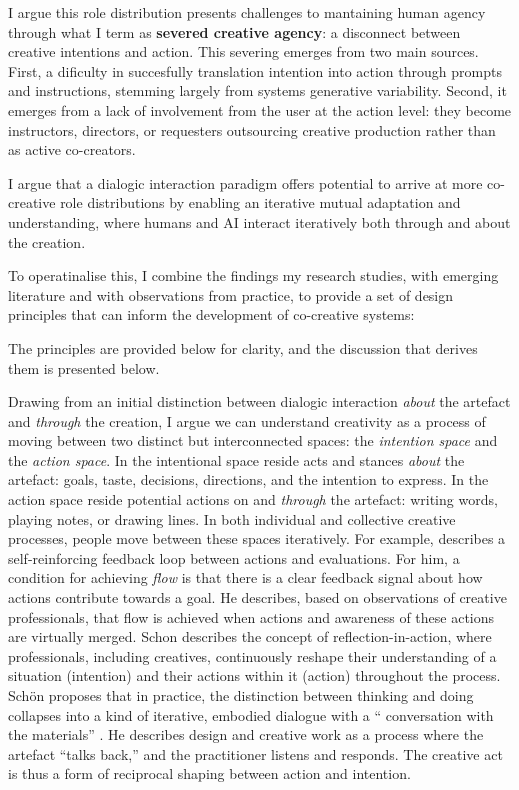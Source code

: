 I argue this role distribution presents challenges to mantaining human agency through what I term as \textbf{severed creative agency}: a disconnect between creative intentions and action. This severing emerges from two main sources. First, a dificulty in succesfully translation intention into action through prompts and instructions, stemming largely from systems generative variability. Second, it emerges from a lack of involvement from the user at the action level: they become instructors, directors, or requesters outsourcing creative production rather than as active co-creators. 

I argue that a dialogic interaction paradigm offers potential to arrive at more co-creative role distributions by enabling an iterative mutual adaptation and understanding, where humans and AI interact iteratively both through and about the creation. 

To operatinalise this, I combine the findings my research studies, with emerging literature and with observations from practice, to provide a set of design principles that can inform the development of co-creative systems: 

The principles are provided below for clarity, and the discussion that derives them is presented below. 


Drawing from an initial distinction between dialogic interaction\textit{ about} the artefact and \textit{through} the creation, I argue we can understand creativity as a process of moving between two distinct but interconnected spaces: the \textit{intention space} and the \textit{action space}. In the intentional space reside acts and stances \textit{about} the artefact: goals, taste, decisions, directions, and the intention to express. In the action space reside potential actions on and \textit{through} the artefact: writing words, playing notes, or drawing lines. In both individual and collective creative processes, people move between these spaces iteratively. For example, \cite{Csikszentmihalyi1997-ui} describes a self-reinforcing feedback loop between actions and evaluations. For him, a condition for achieving \textit{flow} is that there is a clear feedback signal about how actions contribute towards a goal. He describes, based on observations of creative professionals, that flow is achieved when actions and awareness of these actions are virtually merged. Schon\cite{Schon1987-fy} describes the concept of reflection-in-action, where professionals, including creatives, continuously reshape their understanding of a situation (intention) and their actions within it (action) throughout the process. Schön proposes that in practice, the distinction between thinking and doing collapses into a kind of iterative, embodied dialogue with a “ conversation with the materials” \cite{Schon1992-jt}. He describes design and creative work as a process where the artefact “talks back,” and the practitioner listens and responds. The creative act is thus a form of reciprocal shaping between action and intention.



